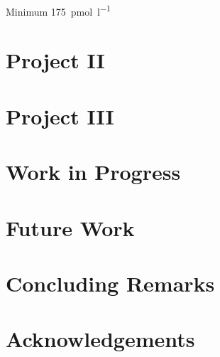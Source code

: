 \documentclass[]{scrbook}
\begin{document}
Minimum \qty{175}{\pmol\per\litre}
\chapter{Project II}

\chapter{Project III}

\chapter{Work in Progress}

\chapter{Future Work}

\chapter{Concluding Remarks}


\backmatter

\chapter{Acknowledgements}
\printbibliography
\end{document}
